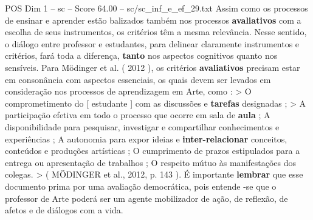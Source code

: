 \begin{textsample}{POS Dim 1 – sc – Score 64.00 – sc/sc\_inf\_e\_ef\_29.txt}
Assim como os processos de ensinar e aprender estão balizados também nos processos \textbf{avaliativos} com a escolha de seus instrumentos, os critérios têm a mesma relevância.
Nesse sentido, o diálogo entre professor e estudantes, para delinear claramente instrumentos e critérios, fará toda a diferença, \textbf{tanto} nos aspectos cognitivos quanto nos sensíveis.
Para Mödinger et al. ( 2012 ), os critérios \textbf{avaliativos} precisam estar em consonância com aspectos essenciais, os quais devem ser levados em consideração nos processos de aprendizagem em Arte, como : > O comprometimento do [ estudante ] com as discussões e \textbf{tarefas} designadas ; > A participação efetiva em todo o processo que ocorre em sala de \textbf{aula} ; A disponibilidade para pesquisar, investigar e compartilhar conhecimentos e experiências ; A autonomia para expor ideias e \textbf{inter-relacionar} conceitos, conteúdos e produções artísticas ; O cumprimento de prazos estipulados para a entrega ou apresentação de trabalhos ; O respeito mútuo às manifestações dos colegas. > ( MÖDINGER et al., 2012, p. 143 ).
É importante \textbf{lembrar} que esse documento prima por uma avaliação democrática, pois entende -se que o professor de Arte poderá ser um agente mobilizador de ação, de reflexão, de afetos e de diálogos com a vida.

\end{textsample}
